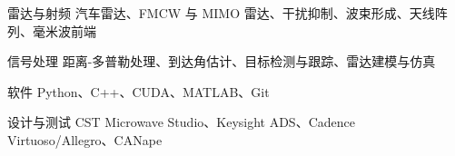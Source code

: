 %


\begin{cvskills}

    \cvskill
        {雷达与射频}
        {汽车雷达、FMCW 与 MIMO 雷达、干扰抑制、波束形成、天线阵列、毫米波前端}

    \cvskill
        {信号处理}
        {距离-多普勒处理、到达角估计、目标检测与跟踪、雷达建模与仿真}

    \cvskill
        {软件}
        {Python、C++、CUDA、MATLAB、Git}

    \cvskill
        {设计与测试}
        {CST Microwave Studio、Keysight ADS、Cadence Virtuoso/Allegro、CANape}

\end{cvskills}
